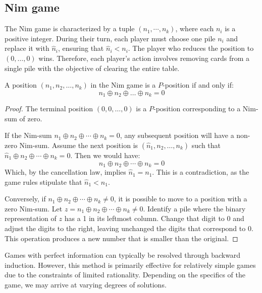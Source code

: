 \subsection{Nim game}
The Nim game is characterized by a tuple $(n_1, \cdots, n_k)$, where each $n_i$ is a positive integer.
During their turn, each player must choose one pile $n_i$ and replace it with $\hat{n}_i$, ensuring that $\hat{n}_i < n_i$. 
The player who reduces the position to $(0, \dots, 0)$ wins. 
Therefore, each player's action involves removing cards from a single pile with the objective of clearing the entire table.

\begin{theorem}[Bouton]
    A position $(n_1, n_2, \dots, n_k)$ in the Nim game is a $P$-position if and only if:
    \[n_1 \oplus n_2 \oplus \dots \oplus n_k = 0\]
\end{theorem}
\begin{proof}
    The terminal position $(0, 0, \dots , 0)$ is a $P$-position corresponding to a Nim-sum of zero.

    If the Nim-sum $n_1 \oplus n_2 \oplus \cdots \oplus n_k = 0$, any subsequent position will have a non-zero Nim-sum. 
    Assume the next position is $(\hat{n}_1, n_2, \ldots, n_k)$ such that $\hat{n}_1 \oplus n_2 \oplus \cdots \oplus n_k = 0$. 
    Then we would have:
    \[n_1 \oplus n_2 \oplus \cdots \oplus n_k = 0\]
    Which, by the cancellation law, implies $\hat{n}_1 = n_1$. 
    This is a contradiction, as the game rules stipulate that $\hat{n}_1 < n_1$.
    
    Conversely, if $n_1 \oplus n_2 \oplus \cdots \oplus n_k \neq 0$, it is possible to move to a position with a zero Nim-sum. 
    Let $z = n_1 \oplus n_2 \oplus \cdots \oplus n_k \neq 0$.
    Identify a pile where the binary representation of $z$ has a 1 in its leftmost column. 
    Change that digit to 0 and adjust the digits to the right, leaving unchanged the digits that correspond to 0. 
    This operation produces a new number that is smaller than the original. 
\end{proof}
\noindent Games with perfect information can typically be resolved through backward induction. 
However, this method is primarily effective for relatively simple games due to the constraints of limited rationality. 
Depending on the specifics of the game, we may arrive at varying degrees of solutions.